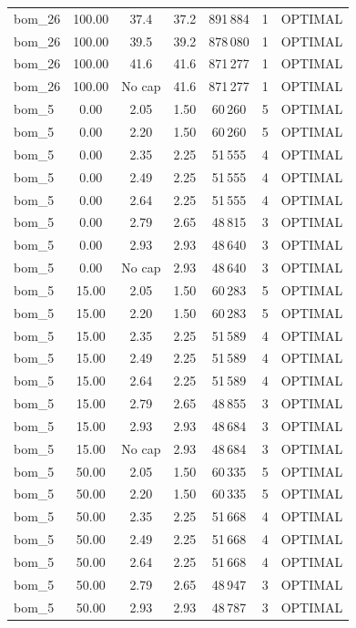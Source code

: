 \begin{table}[!htbp]
\begin{tabular}{lcccccc}
bom\_26 & 100.00 & 37.4 & 37.2 & 891\,884 & 1 & OPTIMAL \\
bom\_26 & 100.00 & 39.5 & 39.2 & 878\,080 & 1 & OPTIMAL \\
bom\_26 & 100.00 & 41.6 & 41.6 & 871\,277 & 1 & OPTIMAL \\
bom\_26 & 100.00 & No cap & 41.6 & 871\,277 & 1 & OPTIMAL \\
bom\_5 & 0.00 & 2.05 & 1.50 & 60\,260 & 5 & OPTIMAL \\
bom\_5 & 0.00 & 2.20 & 1.50 & 60\,260 & 5 & OPTIMAL \\
bom\_5 & 0.00 & 2.35 & 2.25 & 51\,555 & 4 & OPTIMAL \\
bom\_5 & 0.00 & 2.49 & 2.25 & 51\,555 & 4 & OPTIMAL \\
bom\_5 & 0.00 & 2.64 & 2.25 & 51\,555 & 4 & OPTIMAL \\
bom\_5 & 0.00 & 2.79 & 2.65 & 48\,815 & 3 & OPTIMAL \\
bom\_5 & 0.00 & 2.93 & 2.93 & 48\,640 & 3 & OPTIMAL \\
bom\_5 & 0.00 & No cap & 2.93 & 48\,640 & 3 & OPTIMAL \\
bom\_5 & 15.00 & 2.05 & 1.50 & 60\,283 & 5 & OPTIMAL \\
bom\_5 & 15.00 & 2.20 & 1.50 & 60\,283 & 5 & OPTIMAL \\
bom\_5 & 15.00 & 2.35 & 2.25 & 51\,589 & 4 & OPTIMAL \\
bom\_5 & 15.00 & 2.49 & 2.25 & 51\,589 & 4 & OPTIMAL \\
bom\_5 & 15.00 & 2.64 & 2.25 & 51\,589 & 4 & OPTIMAL \\
bom\_5 & 15.00 & 2.79 & 2.65 & 48\,855 & 3 & OPTIMAL \\
bom\_5 & 15.00 & 2.93 & 2.93 & 48\,684 & 3 & OPTIMAL \\
bom\_5 & 15.00 & No cap & 2.93 & 48\,684 & 3 & OPTIMAL \\
bom\_5 & 50.00 & 2.05 & 1.50 & 60\,335 & 5 & OPTIMAL \\
bom\_5 & 50.00 & 2.20 & 1.50 & 60\,335 & 5 & OPTIMAL \\
bom\_5 & 50.00 & 2.35 & 2.25 & 51\,668 & 4 & OPTIMAL \\
bom\_5 & 50.00 & 2.49 & 2.25 & 51\,668 & 4 & OPTIMAL \\
bom\_5 & 50.00 & 2.64 & 2.25 & 51\,668 & 4 & OPTIMAL \\
bom\_5 & 50.00 & 2.79 & 2.65 & 48\,947 & 3 & OPTIMAL \\
bom\_5 & 50.00 & 2.93 & 2.93 & 48\,787 & 3 & OPTIMAL \\

\end{tabular}
\end{table}
